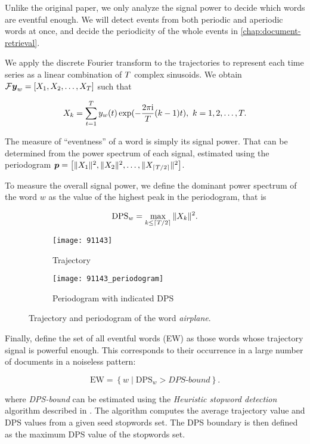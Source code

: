 Unlike the original paper, we only analyze the signal power to decide which words are eventful enough. We will detect events from both periodic and aperiodic words at once, and decide the periodicity of the whole events in \autoref{chap:document-retrieval}.

We apply the discrete Fourier transform to the trajectories to represent each time series as a linear combination of $T$ complex sinusoids. We obtain $\mathcal{F} \vect{\traj}_{w} = \left[ X_{1}, X_{2}, \dots, X_{\streamlen}\right ]$ such that

\begin{equation}
	X_{k} = \sum_{t = 1}^{T}{y_{w}(t) \exp(- \frac{2 \pi \mathrm{i}}{T} (k - 1) t}), ~ k = 1, 2, \dots, T.
\end{equation}

The measure of ``eventness'' of a word is simply its signal power. That can be determined from the power spectrum of each signal, estimated using the periodogram $\vect{P} = \left[ \|X_{1}\|^{2}, \|X_{2}\|^{2}, \dots, \|X_{\ceil{\streamlen / 2}}\|^{2} \right]$.

To measure the overall signal power, we define the dominant power spectrum of the word $w$ as the value of the highest peak in the periodogram, that is

\begin{equation}
	\text{DPS}_{w} = \max\limits_{k \leq \lceil T / 2\rceil}{\|X_{k}\|^{2}}.
\end{equation}


\begin{figure}[H]
\centering
\begin{subfigure}{.5\textwidth}
  \centering
  \texttt{[image: 91143]}  %
  \caption{Trajectory}
  \label{fig:letadlo}
\end{subfigure}%
\begin{subfigure}{.5\textwidth}
  \centering
  \texttt{[image: 91143\_periodogram]}  %
  \caption{Periodogram with indicated DPS}
  \label{fig:letadlo-periodogram}
\end{subfigure}
\caption{Trajectory and periodogram of the word \textit{airplane}.}
\end{figure}

Finally, \cite{event-detection} define the set of all eventful words (EW) as those words whose trajectory signal is powerful enough. This corresponds to their occurrence in a large number of documents in a noiseless pattern:

\begin{equation}
	\text{EW} = \left\{ w \mid \text{DPS}_{w} > \textit{DPS-bound} \right\}.
\end{equation}

where \textit{DPS-bound} can be estimated using the \textit{Heuristic stopword detection} algorithm described in \cite{event-detection}. The algorithm computes the average trajectory value and DPS values from a given seed stopwords set. The DPS boundary is then defined as the maximum DPS value of the stopwords set.